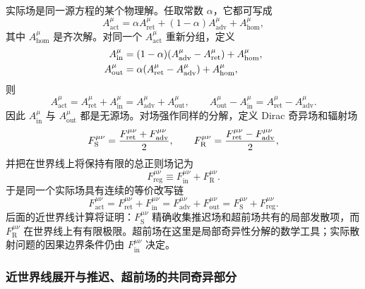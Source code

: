 实际场是同一源方程的某个物理解。任取常数 $\alpha$，它都可写成
\begin{equation}
 A_{\mathrm{act}}^\mu
 =\alpha A_{\mathrm{ret}}^\mu
 +(1-\alpha)A_{\mathrm{adv}}^\mu
 +A_{\mathrm{hom}}^\mu,
 \label{eq:dirac-detail-actual-alpha}
\end{equation}
其中 $A_{\mathrm{hom}}^\mu$ 是齐次解。对同一个 $A_{\mathrm{act}}^\mu$ 重新分组，定义
\begin{align}
 A_{\mathrm{in}}^\mu
 &=(1-\alpha)(A_{\mathrm{adv}}^\mu-A_{\mathrm{ret}}^\mu)
 +A_{\mathrm{hom}}^\mu,
 \notag\\
 A_{\mathrm{out}}^\mu
 &=\alpha(A_{\mathrm{ret}}^\mu-A_{\mathrm{adv}}^\mu)
 +A_{\mathrm{hom}}^\mu,
 \label{eq:dirac-detail-in-out-potentials}
\end{align}
则
\begin{equation}
 A_{\mathrm{act}}^\mu
 =A_{\mathrm{ret}}^\mu+A_{\mathrm{in}}^\mu
 =A_{\mathrm{adv}}^\mu+A_{\mathrm{out}}^\mu,
 \qquad
 A_{\mathrm{out}}^\mu-A_{\mathrm{in}}^\mu
 =A_{\mathrm{ret}}^\mu-A_{\mathrm{adv}}^\mu.
 \label{eq:dirac-detail-actual-in-out-chain}
\end{equation}
因此 $A_{\mathrm{in}}^\mu$ 与 $A_{\mathrm{out}}^\mu$ 都是无源场。对场强作同样的分解，定义 Dirac 奇异场和辐射场
\begin{equation}
 F_{\mathrm S}^{\mu\nu}
 ={F_{\mathrm{ret}}^{\mu\nu}+F_{\mathrm{adv}}^{\mu\nu}\over2},
 \qquad
 F_{\mathrm R}^{\mu\nu}
 ={F_{\mathrm{ret}}^{\mu\nu}-F_{\mathrm{adv}}^{\mu\nu}\over2},
 \label{eq:dirac-detail-SR-fields}
\end{equation}
并把在世界线上将保持有限的总正则场记为
\begin{equation}
 F_{\mathrm{reg}}^{\mu\nu}
 \equiv F_{\mathrm{in}}^{\mu\nu}+F_{\mathrm R}^{\mu\nu}.
 \label{eq:dirac-detail-regular-field-definition}
\end{equation}
于是同一个实际场具有连续的等价改写链
\begin{equation}
 F_{\mathrm{act}}^{\mu\nu}
 =F_{\mathrm{ret}}^{\mu\nu}+F_{\mathrm{in}}^{\mu\nu}
 =F_{\mathrm{adv}}^{\mu\nu}+F_{\mathrm{out}}^{\mu\nu}
 =F_{\mathrm S}^{\mu\nu}+F_{\mathrm{reg}}^{\mu\nu}.
 \label{eq:dirac-detail-actual-field-chain}
\end{equation}
后面的近世界线计算将证明：$F_{\mathrm S}^{\mu\nu}$ 精确收集推迟场和超前场共有的局部发散项，而 $F_{\mathrm R}^{\mu\nu}$ 在世界线上有有限极限。超前场在这里是局部奇异性分解的数学工具；实际散射问题的因果边界条件仍由 $F_{\mathrm{in}}^{\mu\nu}$ 决定。

\subsubsection{近世界线展开与推迟、超前场的共同奇异部分}

